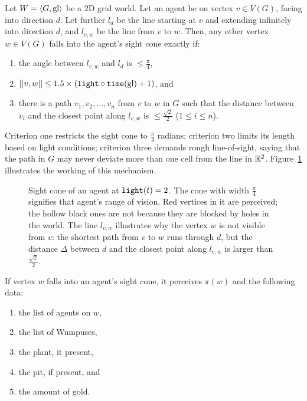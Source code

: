 \begin{definition}
	\label{def:los}
	Let $W = \langle G, \mathrm{gl} \rangle$ be a 2D grid world. Let an agent be on vertex $v \in V(G)$, facing into direction $d$. Let further $l_d$ be the line starting at $v$ and extending infinitely into direction $d$, and $l_{v,w}$ be the line from $v$ to $w$. Then, any other vertex $w \in V(G)$ falls into the agent's sight cone exactly if:
	
	\begin{enumerate}
		\item the angle between $l_{v,w}$ and $l_d$ is $\leq \frac{\pi}{4}$,
		\item $||{v},{w}|| \leq 1.5 \times (\mathtt{light} \circ \mathtt{time} (\mathrm{gl}) + 1)$, and
		\item there is a path $v_1, v_2, \dots, v_n$ from $v$ to $w$ in $G$ such that
		the distance between $v_i$ and the closest point along $l_{v,w}$ is $\leq \frac{\sqrt{2}}{2}$ ($1 \leq i \leq n$).
	\end{enumerate}
\end{definition}

Criterion one restricts the sight cone to $\frac{\pi}{4}$ radians; criterion two limits its length based on light conditions; criterion three demands rough line-of-sight, saying that the path in $G$ may never deviate more than one cell from the line in $\mathbb{R}^2$. Figure~\ref{fig:los} illustrates the working of this mechanism.
%
\begin{figure}
	\centering
	
	\caption{Sight cone of an agent at $\mathtt{light}(t) = 2$. The cone with width $\frac{\pi}{4}$ signifies that agent's range of vision. Red vertices in it are perceived; the hollow black ones are not because they are blocked by holes in the world. The line $l_{v,w}$ illustrates why the vertex $w$ is not visible from $v$: the shortest path from $v$ to $w$ runs through $d$, but the distance $\Delta$ between $d$ and the closest point along $l_{v,w}$ is larger than $\frac{\sqrt{2}}{2}$.}
	\label{fig:los}
\end{figure}
%
If vertex $w$ falls into an agent's sight cone, it perceives $\pi(w)$ and the following data:

\begin{enumerate}
	\item the list of agents on $w$,
	\item the list of Wumpuses,
	\item the plant, it present,
	\item the pit, if present, and
	\item the amount of gold.
\end{enumerate}


